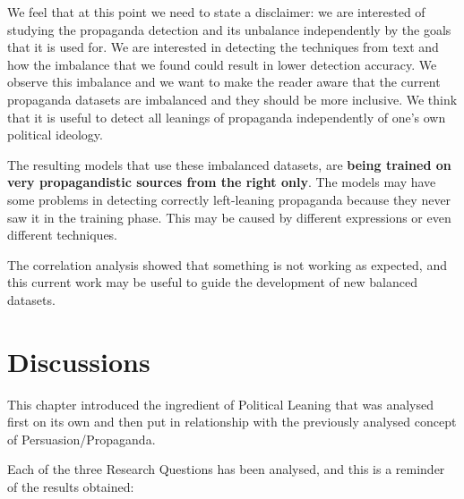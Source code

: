 We feel that at this point we need to state a disclaimer: we are interested of studying the propaganda detection and its unbalance independently by the goals that it is used for. We are interested in detecting the techniques from text and how the imbalance that we found could result in lower detection accuracy.
We observe this imbalance and we want to make the reader aware that the current propaganda datasets are imbalanced and they should be more inclusive.
We think that it is useful to detect all leanings of propaganda independently of one's own political ideology. %




The resulting models that use these imbalanced datasets, are \textbf{being trained on very propagandistic sources from the right only}. The models may have some problems in detecting correctly left-leaning propaganda because they never saw it in the training phase. This may be caused by different expressions or even different techniques.

The correlation analysis showed that something is not working as expected, and this current work may be useful to guide the development of new balanced datasets. 





\section{\statusgreen Discussions}
\label{sec:ps_discussions}

This chapter introduced the ingredient of Political Leaning that was analysed first on its own and then put in relationship with the previously analysed concept of Persuasion/Propaganda.

Each of the three Research Questions has been analysed, and this is a reminder of the results obtained:

